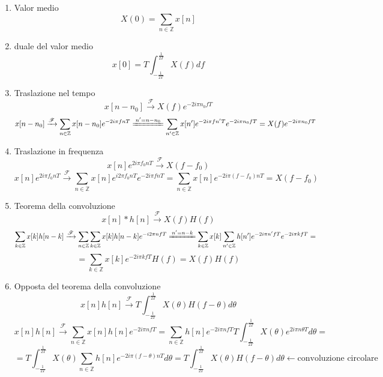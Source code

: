 \documentclass{article}
\newcommand{\trasformata}{\xrightarrow{\mathscr{F}}}
\begin{document}
\begin{enumerate}
    \item Valor medio
        \[X(0)=\sum_{n\in\mathbb{Z}}x[n]\]
    \item duale del valor medio
        \[x[0]=T\int_{-\frac{1}{2T}}^{\frac{1}{2T}}X(f)df\]
    \item Traslazione nel tempo
        \[x[n-n_0]\trasformata X(f)e^{-2i\pi n_0 fT}\]
        \[x[n-n_0]\trasformata\sum_{n\in\mathbb{Z}}x[n-n_0]e^{-2i\pi fnT}\xlongequal{n'=n-n_0}\sum_{n'\in\mathbb{Z}}x[n']e^{-2i\pi fn'T}e^{-2i\pi n_0 fT}=X(f)e^{-2i\pi n_0 fT}\]
    \item Traslazione in frequenza
        \[x[n]e^{2i\pi f_0 nT}\trasformata X(f-f_0)\]
        \[x[n]e^{2i\pi f_0 nT}\trasformata\sum_{n\in\mathbb{Z}}x[n]e^{i2\pi f_0 nT}e^{-2i\pi fnT}=\sum_{n\in\mathbb{Z}}x[n]e^{-2i\pi(f-f_0)nT}=X(f-f_0)\]
    \item Teorema della convoluzione
        \[x[n]*h[n]\trasformata X(f)H(f)\]
        \[\sum_{k\in\mathbb{Z}}x[k]h[n-k]\trasformata \sum_{n\in\mathbb{Z}}\sum_{k\in\mathbb{Z}}x[k]h[n-k]e^{-i2\pi nfT}\xlongequal{n'=n-k}\sum_{k\in\mathbb{Z}}x[k]\sum_{n'\in\mathbb{Z}}h[n']e^{-2i\pi n'fT}e^{-2i\pi kfT}=\]
        \[=\sum_{k\in\mathbb{Z}}x[k]e^{-2i\pi kfT}H(f)=X(f)H(f)\]
    \item Opposta del teorema della convoluzione
        \[x[n]h[n]\trasformata T\int_{-\frac{1}{2T}}^\frac{1}{2T}X(\theta)H(f-\theta)d\theta\]
        \[x[n]h[n]\trasformata\sum_{n\in\mathbb{Z}}x[n]h[n]e^{-2i\pi nfT}=\sum_{n\in\mathbb{Z}}h[n]e^{-2i\pi nfT}T\int_{-\frac{1}{2T}}^{\frac{1}{2T}}X(\theta)e^{2i\pi n\theta T}d\theta=\]
        \[=T\int_{-\frac{1}{2T}}^\frac{1}{2T}X(\theta)\sum_{n\in\mathbb{Z}} h[n]e^{-2i\pi (f-\theta)nT}d\theta=T\int_{-\frac{1}{2T}}^\frac{1}{2T}X(\theta)H(f-\theta)d\theta\leftarrow\text{convoluzione circolare}\]


\end{enumerate}
\end{document}
